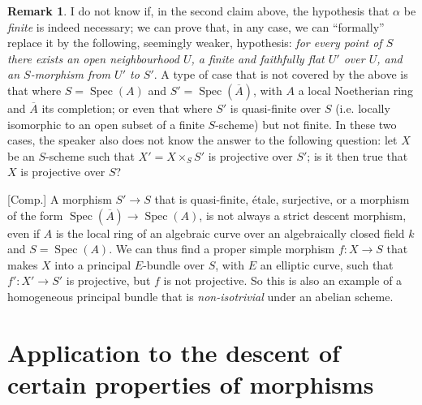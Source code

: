 \documentclass{article}
\theoremstyle{plain}
\theoremstyle{definition}
\newtheorem*{remark}{Remark}
\DeclareMathOperator{\Spec}{Spec}
\begin{document}
\begin{remark}
  I do not know if, in the second claim above, the hypothesis that $\alpha$ be \emph{finite} is indeed necessary;
  we can prove that, in any case, we can ``formally'' replace it by the following, seemingly weaker, hypothesis:
  \emph{for every point of $S$ there exists an open neighbourhood $U$, a finite and faithfully flat $U'$ over $U$, and an $S$-morphism from $U'$ to $S'$}.
  A type of case that is not covered by the above is that where $S=\Spec(A)$ and $S'=\Spec(\overline{A})$, with $A$ a local Noetherian ring and $\overline{A}$ its completion;
  or even that where $S'$ is quasi-finite over $S$ (i.e. locally isomorphic to an open subset of a finite $S$-scheme) but not finite.
  In these two cases, the speaker also does not know the answer to the following question:
  let $X$ be an $S$-scheme such that $X'=X\times_S S'$ is projective over $S'$;
  is it then true that $X$ is projective over $S$?

  [Comp.]
  A morphism $S'\to S$ that is quasi-finite, \'{e}tale, surjective, or a morphism of the form $\Spec(\overline{A})\to\Spec(A)$, is not always a strict descent morphism, even if $A$ is the local ring of an algebraic curve over an algebraically closed field $k$ and $S=\Spec(A)$.
  We can thus find a proper simple morphism $f\colon X\to S$ that makes $X$ into a principal $E$-bundle over $S$, with $E$ an elliptic curve, such that $f'\colon X'\to S'$ is projective, but $f$ is not projective.
  So this is also an example of a homogeneous principal bundle that is \emph{non-isotrivial} under an abelian scheme.
\end{remark}


\section{Application to the descent of certain properties of morphisms}
\label{B.2}
\end{document}
